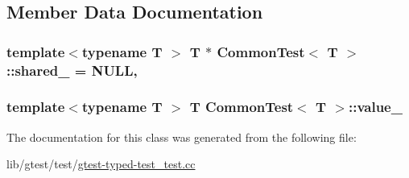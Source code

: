 \subsection{Member Data Documentation}
\hypertarget{class_common_test_a52368ce1e65a865db9bdccbcc2cedaac}{
\subsubsection[{shared\-\_\-}]{\setlength{\rightskip}{0pt plus 5cm}template$<$typename T $>$ T $\ast$ {\bf Common\-Test}$<$ T $>$\-::shared\-\_\- = N\-U\-L\-L\hspace{0.3cm}{\ttfamily [static]}, {\ttfamily [protected]}}}\label{class_common_test_a52368ce1e65a865db9bdccbcc2cedaac}
\hypertarget{class_common_test_ae59c4abcb833625a7baeb2048531ebec}{
\subsubsection[{value\-\_\-}]{\setlength{\rightskip}{0pt plus 5cm}template$<$typename T $>$ T {\bf Common\-Test}$<$ T $>$\-::value\-\_\-\hspace{0.3cm}{\ttfamily [protected]}}}\label{class_common_test_ae59c4abcb833625a7baeb2048531ebec}


The documentation for this class was generated from the following file\-:\begin{DoxyCompactItemize}
\item 
lib/gtest/test/\hyperlink{gtest-typed-test__test_8cc}{gtest-\/typed-\/test\-\_\-test.\-cc}\end{DoxyCompactItemize}
